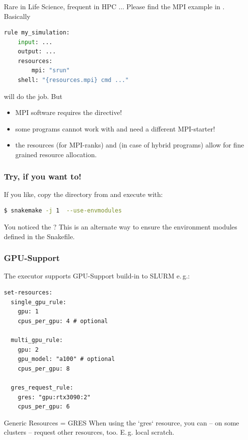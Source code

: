 \begin{frame}[fragile]
	\frametitle{}
	Rare in Life Science, frequent in HPC $\ldots$\newline
	Please find the MPI example in . Basically
	\begin{lstlisting}[language=Python,style=Python]
rule my_simulation:
    input: ...
    output: ...
    resources:
        mpi: "srun"
    shell: "{resources.mpi} cmd ..."
    \end{lstlisting}
    will do the job. But
    \begin{warning}
    	\begin{itemize}[<+->]
    		\item MPI software requires the  directive!
    		\item some programs cannot work with  and need a different MPI-starter!
    		\item the resources  (for MPI-ranks) and  (in case of hybrid programs) allow for fine grained resource allocation.
    	\end{itemize}
    \end{warning}
\end{frame}

\begin{frame}[fragile]
	\frametitle{Try, if you want to!}
	If you like, copy the  directory from  and execute with:
	\begin{lstlisting}[language=Bash, style=Shell]	
$ snakemake -j 1  --use-envmodules
    \end{lstlisting}
    \begin{hint}
    	You noticed the ? This is an alternate way to ensure the environment modules defined in the Snakefile.
    \end{hint}
\end{frame}

\begin{frame}[fragile]
	\frametitle{GPU-Support}
	The executor supports GPU-Support build-in to SLURM e.\,g.:
        \begin{lstlisting}[style=Plain]
set-resources:
  single_gpu_rule:
    gpu: 1
    cpus_per_gpu: 4 # optional

  multi_gpu_rule:
    gpu: 2
    gpu_model: "a100" # optional
    cpus_per_gpu: 8

  gres_request_rule:
    gres: "gpu:rtx3090:2"
    cpus_per_gpu: 6
    \end{lstlisting}
    \pause
    \begin{block}{Generic Resources = GRES}
    	When using the `gres` resource, you can -- on some clusters -- request other resources, too. E.\,g. local scratch.
    \end{block}
\end{frame}
